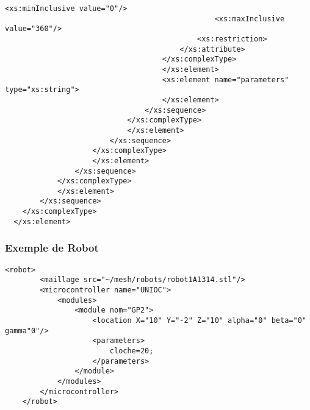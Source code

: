 \begin{changemargin}{-1cm}{-1cm}
\begin{lstlisting}[caption=Description du Robot, label=descbot]
                                                <xs:minInclusive value="0"/>
                                                <xs:maxInclusive value="360"/>
                                            <xs:restriction>
                                        </xs:attribute>
                                    </xs:complexType>
                                    </xs:element>
                                    <xs:element name="parameters" type="xs:string">
                                    </xs:element>
                                </xs:sequence>
                            </xs:complexType>
                            </xs:element>
                        </xs:sequence>
                    </xs:complexType>
                    </xs:element>
                </xs:sequence>
            </xs:complexType>
            </xs:element>
        </xs:sequence>
    </xs:complexType>
  </xs:element>
  \end{lstlisting}
\end{changemargin}

\subsubsection{Exemple de Robot}
\begin{lstlisting}[caption=Description de la Table, label=desctable]
	<robot>
		<maillage src="~/mesh/robots/robot1A1314.stl"/>
		<microcontroller name="UNIOC">
			<modules>
				<module nom="GP2">
					<location X="10" Y="-2" Z="10" alpha="0" beta="0" gamma"0"/>
					<parameters>
						cloche=20;
					</parameters>
				</module>
			</modules>
		</microcontroller>
	</robot>
\end{lstlisting}
  
\clearpage
